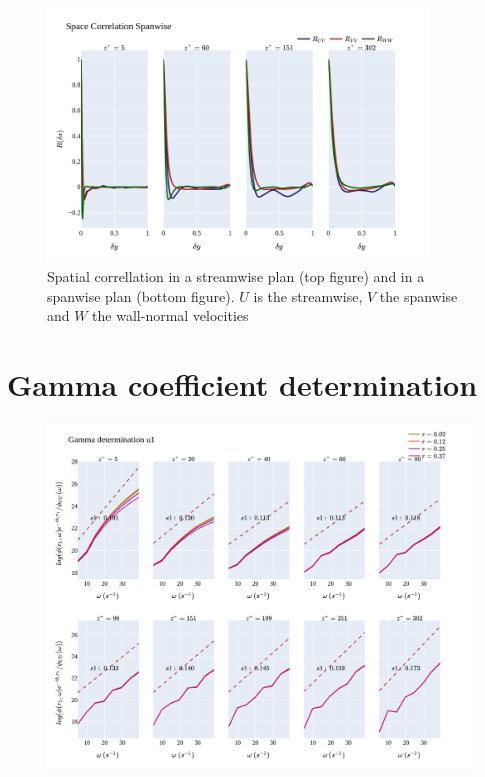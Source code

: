 \documentclass[]{article}
\theoremstyle{plain}
\theoremstyle{remark}
\begin{document}
\begin{figure}[H]
	\begin{center}
		\includegraphics[width=0.9\textwidth]{../../output/figures/channel_wrles_retau395/split_time/space_correlation/spanwise.png}
		\caption{Spatial correllation in a streamwise plan (top figure) and in a spanwise plan (bottom figure). $U$ is the streamwise, $V$ the spanwise and $W$ the wall-normal velocities}
	\end{center}
\end{figure}


\section{Gamma coefficient determination}

\begin{figure}[H]
	\begin{center}
		\includegraphics[width=\textwidth]{../../output/figures/channel_wrles_retau395/split_time/gamma/gamma_u1_w_all.png}
	\end{center}
\end{figure}
\end{document}
